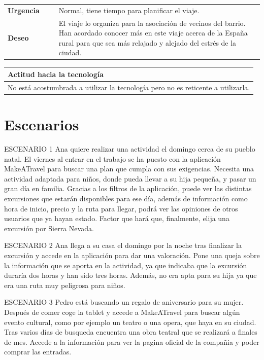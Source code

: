 \documentclass[11pt]{article}
\begin{document}
\begin{table}[H]
	\begin{tabular}{p{0.2\linewidth}|p{0.8\linewidth}}
		\toprule
		\textbf{Urgencia} & Normal, tiene tiempo para planificar el viaje.\\
		\textbf{Deseo}  & El viaje lo organiza para la asociación de vecinos del barrio. Han acordado conocer más en este viaje acerca de la España rural para que sea más relajado y alejado del estrés de la ciudad.\\
		\bottomrule
	\end{tabular}
	
	\begin{tabular}{p{1.028\linewidth}}
		\textbf{Actitud hacia la tecnología}\\
		\midrule
		No está acostumbrada a utilizar la tecnología pero no es reticente a utilizarla.
	\end{tabular}
\end{table}

\newpage
\section{Escenarios}
ESCENARIO 1
Ana quiere realizar una actividad el domingo cerca de su pueblo natal. El viernes al entrar en el trabajo se ha puesto con la aplicación MakeATravel para buscar una plan que cumpla con sus exigencias.
Necesita una actividad adaptada para niños, donde pueda llevar a su hija pequeña, y pasar un gran día en familia.
Gracias a los filtros de la aplicación, puede ver las distintas excursiones que estarán disponibles para ese día, además de información como hora de inicio, precio y la ruta para llegar, podrá ver las opiniones de otros usuarios que ya hayan estado. Factor que hará que, finalmente, elija una excursión por Sierra Nevada.

ESCENARIO 2
Ana llega a su casa el domingo por la noche tras finalizar la excursión y accede en la aplicación para dar una valoración. Pone una queja sobre la información que se aporta en la actividad, ya que indicaba que la excursión duraría dos horas y han sido tres horas. Además, no era apta para su hija ya que era una ruta muy peligrosa para niños.

ESCENARIO 3
Pedro está buscando un regalo de aniversario para su mujer. Después de comer coge la tablet y accede a MakeATravel para buscar algún evento cultural, como por ejemplo un teatro o una opera, que haya en su ciudad. Tras varios días de busqueda encuentra una obra teatral que se realizará a finales de mes. Accede a la información para ver la pagina oficial de la compañia y poder comprar las entradas.
\end{document}
